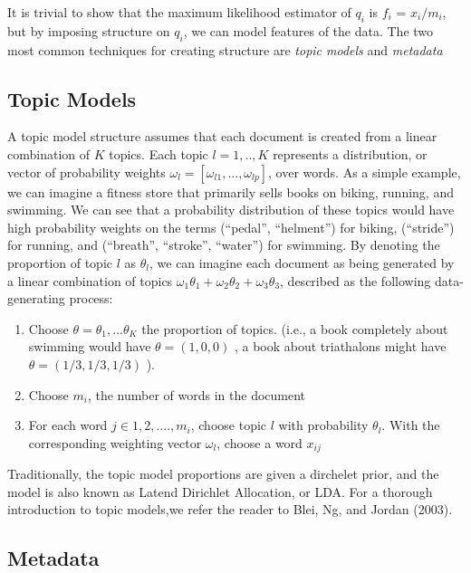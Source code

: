 \documentclass[12pt]{article}
\begin{document}
It is trivial to show that the maximum likelihood estimator of $q_i$ is
$f_i$ = $x_i / m_i$, but by imposing structure on $q_i$, we can model
features of the data. The two most common techniques for creating
structure are \emph{topic models} and \emph{metadata}

\subsection{Topic Models}\label{topic-models}

A topic model structure assumes that each document is created from a
linear combination of $K$ topics. Each topic $l = 1,..,K$ represents a
distribution, or vector of probability weights
$\omega_l = [\omega_{l1}, ... , \omega_{lp}]$, over words. As a simple
example, we can imagine a fitness store that primarily sells books on
biking, running, and swimming. We can see that a probability
distribution of these topics would have high probability weights on the
terms (``pedal'', ``helment'') for biking, (``stride'') for running, and
(``breath'', ``stroke'', ``water'') for swimming. By denoting the
proportion of topic $l$ as $\theta_l$, we can imagine each document as
being generated by a linear combination of topics
$\omega_1 \theta_1 + \omega_2 \theta_2 + \omega_3 \theta_3$, described
as the following data-generating process:

\begin{enumerate}
\def\labelenumi{\arabic{enumi}.}
\itemsep1pt\parskip0pt
\item
  Choose $\theta = \theta_1,...\theta_K$ the proportion of topics.
  (i.e., a book completely about swimming would have $\theta=(1,0,0)$ ,
  a book about triathalons might have $\theta =(1/3,1/3,1/3)$ ).
\item
  Choose $m_i$, the number of words in the document
\item
  For each word $j \in 1,2,....,m_i$, choose topic $l$ with probability
  $\theta_l$. With the corresponding weighting vector $\omega_l$, choose
  a word $x_{ij}$
\end{enumerate}

Traditionally, the topic model proportions are given a dirchelet prior, and the model is also known as Latend Dirichlet Allocation, or LDA. 
For a thorough introduction to topic models,we refer the reader to Blei, Ng, and Jordan (2003). 

\subsection{Metadata}\label{metadata}
\end{document}
